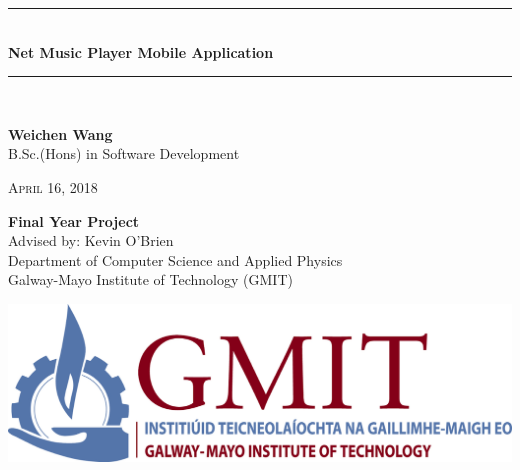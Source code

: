 \documentclass[12pt,a4paper,oneside,openany]{book}
\newcommand{\projecttitle}{Net Music Player Mobile Application}
\newcommand{\projectauthor}{Weichen Wang}
\newcommand{\projectadvisor}{Kevin O'Brien}
\newcommand{\projectprogramme}{B.Sc.(Hons) in Software Development}
\newcommand{\projectdate}{April 16, 2018}
\begin{document}
  \begin{titlepage}
    \begin{minipage}[t][6cm]{\textwidth}
      \centering
      \rule{\linewidth}{0.5mm} \\[0.4cm]
      { \LARGE \bfseries \projecttitle \\[0.4cm] }
      \rule{\linewidth}{0.5mm} \\[0.8cm]
    \end{minipage}
    
    \begin{minipage}[t][6.5cm]{\textwidth}
      \centering
      \textbf{\projectauthor}\\[0.5cm]
      \projectprogramme
    \end{minipage}
  
    \begin{minipage}[t][1cm]{\textwidth}
      \centering
      \textsc{\projectdate}
    \end{minipage}
      
    \begin{minipage}[t][3cm]{\textwidth}
      \centering
      \textbf{Final Year Project}\\[0.3cm]
      Advised by: \projectadvisor \\[0.1cm]
      Department of Computer Science and Applied Physics\\
      Galway-Mayo Institute of Technology (GMIT)
    \end{minipage}
  
    \begin{center}    

      \includegraphics{img/gmit-logo.jpg}
    \end{center}
  \end{titlepage}
  \setcounter{page}{2}
  \tableofcontents
  
  
\end{document}
